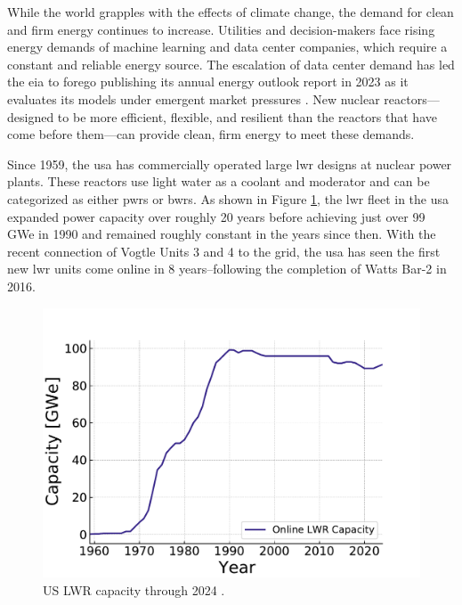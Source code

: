While the world grapples with the effects of climate change, the demand for clean and firm energy continues to increase. Utilities and decision-makers face rising energy demands of machine learning and data center companies, which require a constant and reliable energy source. The escalation of data center demand has led the \gls{eia} to forego publishing its annual energy outlook report in 2023 as it evaluates its models under emergent market pressures \cite{eia_annual_outlook_canceled_2023}. New nuclear reactors---designed to be more efficient, flexible, and resilient than the reactors that have come before them---can provide clean, firm energy to meet these demands.

Since 1959, the \gls{usa} has commercially operated large \gls{lwr} designs at
nuclear power plants. These reactors use light water as a coolant and moderator
and can be categorized as either \glspl{pwr} or \glspl{bwr}. As shown in Figure
\ref{fig:online_lwr_cap_2024}, the \gls{lwr} fleet in the \gls{usa} expanded power capacity over roughly 20 years before achieving just over 99 GWe in
1990 and remained roughly constant in the years since then. With the recent
connection of Vogtle Units 3 and 4 to the grid, the \gls{usa} has seen the
first new \gls{lwr} units come online in 8 years--following the completion of
Watts Bar-2 in 2016.

\begin{figure}[H]
    \centering
    \includegraphics[scale=0.7]{images/intro/online_lwr_cap_2024.pdf}
    \caption{US LWR capacity through 2024 \cite{IAEA_PRIS}.}
    \label{fig:online_lwr_cap_2024}
\end{figure}

